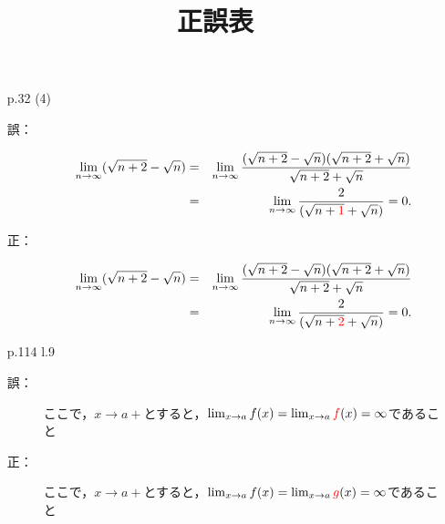 \documentclass[pdflatex,ja=standard,a4paper]{bxjsarticle}
\title{正誤表}
\author{}
\begin{document}
\maketitle


\begin{enumerate}
\item[p.32 (4)]\quad 
\begin{description}
\item[誤：] 
\begin{eqnarray*}
			\lim_{n\to\infty}(\sqrt{n+2}-\sqrt{n})
			&=& \lim_{n\to\infty}
			\frac{(\sqrt{n+2}-\sqrt{n})(\sqrt{n+2}+\sqrt{n})}{\sqrt{n+2}+\sqrt{n}}\\
			&=& \lim_{n\to\infty}
			\frac{2}{(\sqrt{n+\textcolor{red}{1}}+\sqrt{n})}=0.
\end{eqnarray*}
\item[正：] 
\begin{eqnarray*}
			\lim_{n\to\infty}(\sqrt{n+2}-\sqrt{n})
			&=& \lim_{n\to\infty}
			\frac{(\sqrt{n+2}-\sqrt{n})(\sqrt{n+2}+\sqrt{n})}{\sqrt{n+2}+\sqrt{n}}\\
		&=& \lim_{n\to\infty}
		\frac{2}{(\sqrt{n+\textcolor{red}{2}}+\sqrt{n})}=0.
\end{eqnarray*}
\end{description}
\item[p.114 l.9]\quad 
\begin{description}
\item[誤：] 
ここで，$x\to a+$とすると，$\lim_{x\to a}f(x)=\lim_{x\to a}\textcolor{red}{f}(x)=\infty$であること
\item[正：] 
ここで，$x\to a+$とすると，$\lim_{x\to a}f(x)=\lim_{x\to a}\textcolor{red}{g}(x)=\infty$であること
\end{description}
\end{enumerate}
\end{document}
